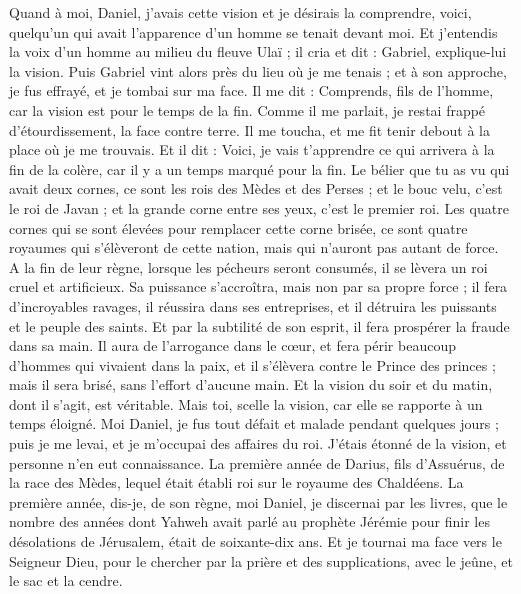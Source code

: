 \begin{multicols}{2}
Quand à moi, Daniel, j'avais cette vision et je désirais la comprendre, voici, quelqu'un qui avait l'apparence d'un homme se tenait devant moi.
Et j'entendis la voix d'un homme au milieu du fleuve Ulaï ; il cria et dit : Gabriel, explique-lui la vision.
Puis Gabriel vint alors près du lieu où je me tenais ; et à son approche, je fus effrayé, et je tombai sur ma face. Il me dit : Comprends, fils de l'homme, car la vision est pour le temps de la fin.
Comme il me parlait, je restai frappé d'étourdissement, la face contre terre. Il me toucha, et me fit tenir debout à la place où je me trouvais.
Et il dit : Voici, je vais t'apprendre ce qui arrivera à la fin de la colère, car il y a un temps marqué pour la fin.
Le bélier que tu as vu qui avait deux cornes, ce sont les rois des Mèdes et des Perses ;
et le bouc velu, c'est le roi de Javan ; et la grande corne entre ses yeux, c'est le premier roi.
Les quatre cornes qui se sont élevées pour remplacer cette corne brisée, ce sont quatre royaumes qui s'élèveront de cette nation, mais qui n'auront pas autant de force.
A la fin de leur règne, lorsque les pécheurs seront consumés, il se lèvera un roi cruel et artificieux.
Sa puissance s'accroîtra, mais non par sa propre force ; il fera d'incroyables ravages, il réussira dans ses entreprises, et il détruira les puissants et le peuple des saints.
Et par la subtilité de son esprit, il fera prospérer la fraude dans sa main. Il aura de l'arrogance dans le cœur, et fera périr beaucoup d'hommes qui vivaient dans la paix, et il s'élèvera contre le Prince des princes ; mais il sera brisé, sans l'effort d'aucune main.
Et la vision du soir et du matin, dont il s'agit, est véritable. Mais toi, scelle la vision, car elle se rapporte à un temps éloigné.
Moi Daniel, je fus tout défait et malade pendant quelques jours ; puis je me levai, et je m'occupai des affaires du roi. J'étais étonné de la vision, et personne n'en eut connaissance.
\VerseOne{}La première année de Darius, fils d'Assuérus, de la race des Mèdes, lequel était établi roi sur le royaume des Chaldéens.
La première année, dis-je, de son règne, moi Daniel, je discernai par les livres, que le nombre des années dont Yahweh avait parlé au prophète Jérémie pour finir les désolations de Jérusalem, était de soixante-dix ans. 
Et je tournai ma face vers le Seigneur Dieu, pour le chercher par la prière et des supplications, avec le jeûne, et le sac et la cendre.

\end{multicols}
